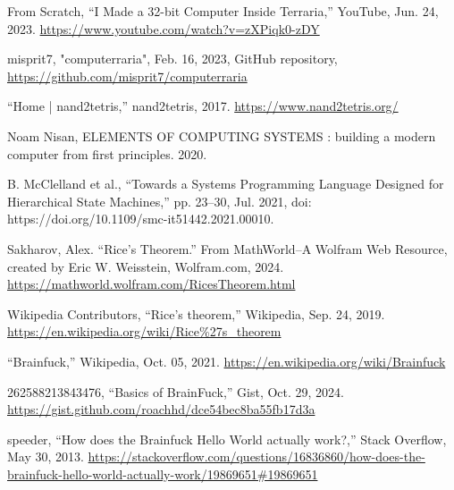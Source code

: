\documentclass[12pt]{report} %
\begin{document}
\begin{singlespace}
\begin{thebibliography}{}
             From Scratch, “I Made a 32-bit Computer Inside Terraria,” YouTube, Jun. 24, 2023. \href{https://www.youtube.com/watch?v=zXPiqk0-zDY}{https://www.youtube.com/watch?v=zXPiqk0-zDY}

             misprit7, "computerraria", Feb. 16, 2023, GitHub repository, \href{https://github.com/misprit7/computerraria}{https://github.com/misprit7/computerraria}
            
             “Home | nand2tetris,” nand2tetris, 2017. \href{https://www.nand2tetris.org/}{https://www.nand2tetris.org/}

             Noam Nisan, ELEMENTS OF COMPUTING SYSTEMS : building a modern computer from first principles. 2020.
            
             B. McClelland et al., “Towards a Systems Programming Language Designed for Hierarchical State Machines,” pp. 23–30, Jul. 2021, doi: https://doi.org/10.1109/smc-it51442.2021.00010.


             Sakharov, Alex. “Rice’s Theorem.” From MathWorld--A Wolfram Web Resource, created by Eric W. Weisstein, Wolfram.com, 2024. \href{https://mathworld.wolfram.com/RicesTheorem.html}{https://mathworld.wolfram.com/RicesTheorem.html}
            
             Wikipedia Contributors, “Rice’s theorem,” Wikipedia, Sep. 24, 2019. \href{https://en.wikipedia.org/wiki/Rice%27s_theorem}{https://en.wikipedia.org/wiki/Rice\%27s\_theorem}
            
             “Brainfuck,” Wikipedia, Oct. 05, 2021. \href{https://en.wikipedia.org/wiki/Brainfuck}{https://en.wikipedia.org/wiki/Brainfuck}
            
             262588213843476, “Basics of BrainFuck,” Gist, Oct. 29, 2024. \href{https://gist.github.com/roachhd/dce54bec8ba55fb17d3a}{https://gist.github.com/roachhd/dce54bec8ba55fb17d3a}

             speeder, “How does the Brainfuck Hello World actually work?,” Stack Overflow, May 30, 2013. \href{https://stackoverflow.com/questions/16836860/how-does-the-brainfuck-hello-world-actually-work/19869651#19869651}{https://stackoverflow.com/questions/16836860/how-does-the-brainfuck-hello-world-actually-work/19869651\#19869651}
                        

\end{thebibliography}
\end{singlespace}
\end{document}
